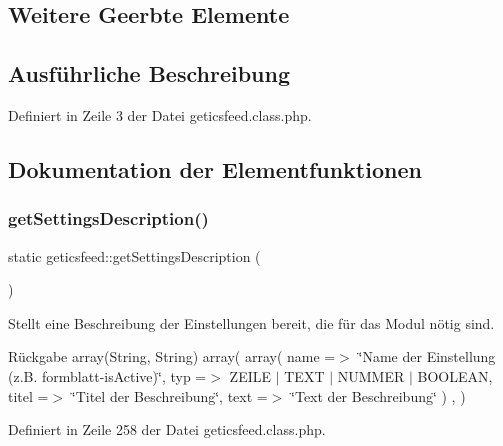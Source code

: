 \subsection*{Weitere Geerbte Elemente}


\subsection{Ausführliche Beschreibung}


Definiert in Zeile 3 der Datei geticsfeed.\+class.\+php.



\subsection{Dokumentation der Elementfunktionen}
\mbox{\label{classgeticsfeed_a7b8828c3e8b9774c242118d5c807e837}} 
\subsubsection{\texorpdfstring{get\+Settings\+Description()}{getSettingsDescription()}}
{\footnotesize\ttfamily static geticsfeed\+::get\+Settings\+Description (\begin{DoxyParamCaption}{ }\end{DoxyParamCaption})\hspace{0.3cm}{\ttfamily [static]}}

Stellt eine Beschreibung der Einstellungen bereit, die für das Modul nötig sind. \begin{DoxyReturn}{Rückgabe}
array(\+String, String) array( array( \textquotesingle{}name\textquotesingle{} =$>$ \char`\"{}\+Name der Einstellung (z.\+B. formblatt-\/is\+Active)\char`\"{}, \textquotesingle{}typ\textquotesingle{} =$>$ Z\+E\+I\+LE $\vert$ T\+E\+XT $\vert$ N\+U\+M\+M\+ER $\vert$ B\+O\+O\+L\+E\+AN, \textquotesingle{}titel\textquotesingle{} =$>$ \char`\"{}\+Titel der Beschreibung\char`\"{}, \textquotesingle{}text\textquotesingle{} =$>$ \char`\"{}\+Text der Beschreibung\char`\"{} ) , ) 
\end{DoxyReturn}


Definiert in Zeile 258 der Datei geticsfeed.\+class.\+php.

\mbox{\label{classgeticsfeed_a15c3e1cbcdf7ad3ab4120690be5f587a}} 
